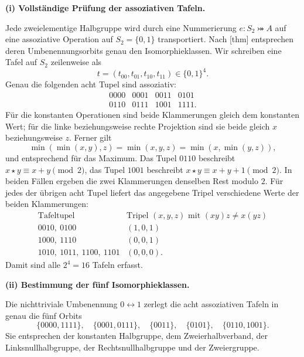 \par\medskip\noindent\textbf{(i) Vollständige Prüfung der assoziativen Tafeln.}\par
Jede zweielementige Halbgruppe wird durch eine Nummerierung
\(e\colon S_2\bij A\) auf eine assoziative Operation auf
\(S_2=\{0,1\}\) transportiert.  Nach
[thm]
entsprechen deren Umbenennungsorbits genau den Isomorphieklassen.
Wir schreiben eine Tafel auf \(S_2\) zeilenweise als
\[
  t=(t_{00},t_{01},t_{10},t_{11})\in\{0,1\}^{4}.
\]
Genau die folgenden acht Tupel sind assoziativ:
\[
\begin{array}{cccc}
0000&0001&0011&0101\\
0110&0111&1001&1111.
\end{array}
\]
Für die konstanten Operationen sind beide Klammerungen gleich dem konstanten
Wert; für die linke beziehungsweise rechte Projektion sind sie beide gleich
\(x\) beziehungsweise \(z\).  Ferner gilt
\[
  \min(\min(x,y),z)=\min(x,y,z)=\min(x,\min(y,z)),
\]
und entsprechend für das Maximum.  Das Tupel \(0110\) beschreibt
\(x\star y\equiv x+y\pmod2\), das Tupel \(1001\) beschreibt
\(x\star y\equiv x+y+1\pmod2\).  In beiden Fällen ergeben die zwei
Klammerungen denselben Rest modulo \(2\).
Für jedes der übrigen acht Tupel liefert das angegebene Tripel verschiedene
Werte der beiden Klammerungen:
\[
\begin{array}{c|c}
\text{Tafeltupel}&\text{Tripel }(x,y,z)\text{ mit }(xy)z\neq x(yz)\\
\hline
0010,\ 0100&(1,0,1)\\
1000,\ 1110&(0,0,1)\\
1010,\ 1011,\ 1100,\ 1101&(0,0,0).
\end{array}
\]
Damit sind alle \(2^4=16\) Tafeln erfasst.

\par\medskip\noindent\textbf{(ii) Bestimmung der fünf Isomorphieklassen.}\par
Die nichttriviale Umbenennung \(0\leftrightarrow1\) zerlegt die acht
assoziativen Tafeln in genau die fünf Orbits
\[
\{0000,1111\},\quad
\{0001,0111\},\quad
\{0011\},\quad
\{0101\},\quad
\{0110,1001\}.
\]
Sie entsprechen der konstanten Halbgruppe, dem Zweierhalbverband, der
Linksnullhalbgruppe, der Rechtsnullhalbgruppe und der Zweiergruppe.

